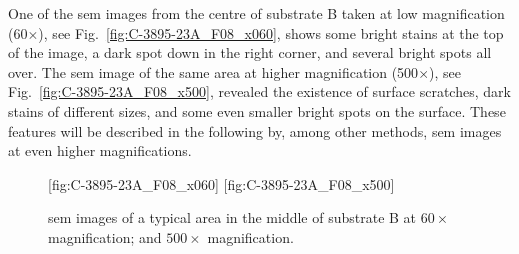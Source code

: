 


One of the \ac{sem} images from the centre of substrate B taken at low magnification (60$\times$), see Fig.~\ref{fig:C-3895-23A_F08_x060}, shows some bright stains at the top of the image, a dark spot down in the right corner, and several bright spots all over. The \ac{sem} image of the same area at higher magnification (500$\times$), see Fig.~\ref{fig:C-3895-23A_F08_x500}, revealed the existence of surface scratches, dark stains of different sizes, and some even smaller bright spots on the surface. These features will be described in the following by, among other methods, \ac{sem} images at even higher magnifications.

\begin{figure}[htbp]
    \centering
    [fig:C-3895-23A_F08_x060]
    \hfill
    [fig:C-3895-23A_F08_x500]
    \caption[\Ac{sem} images of a typical area in the middle of substrate B.]{\Ac{sem} images of a typical area in the middle of substrate B at  $60\times$ magnification; and  $500\times$ magnification.}
    \label{fig:SEM_C389523_overview}
\end{figure}

